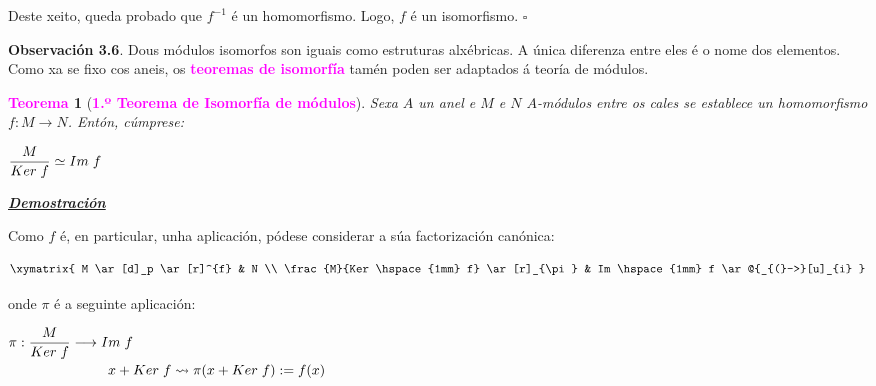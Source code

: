\documentclass[twoside]{report}
\newcommand{\magbf}[1]{\textcolor{magenta}{\textbf{#1}}} %
\theoremstyle{mystyle}
\newtheorem{theo}{\magbf{Teorema}}[chapter]
\newenvironment{theorem}
{\begin{mdframed}[linecolor = magenta,backgroundcolor = classicrose, linewidth = 2mm]\begin{theo}}
{\end{theo}\end{mdframed}}
\begin{document}
\noindent Deste xeito, queda probado que $f^{-1}$ é un homomorfismo. Logo, $f$ é un isomorfismo. $\square$\\

\vspace{3mm}

\noindent \textbf{Observación 3.6}. Dous módulos isomorfos son iguais como estruturas alxébricas. A única diferenza entre eles é o nome dos elementos.\\

\noindent Como xa se fixo cos aneis, os \magbf{teoremas de isomorfía} tamén poden ser adaptados á teoría de módulos.\\

\begin{theorem}[\magbf{1.º Teorema de Isomorfía de módulos}] \label{th3.1}
Sexa $A$ un anel e $M$ e $N$ $A$-módulos entre os cales se establece un homomorfismo $f: M \longrightarrow N$. Entón, cúmprese:
\begin{center}
    $\displaystyle \frac{M}{Ker \hspace{1mm} f} \simeq Im \hspace{1mm} f$
\end{center}
\end{theorem}

\vspace{2mm}

\noindent \textbf{\textit{\underline{Demostración}}}

\vspace{2mm}

\noindent Como $f$ é, en particular, unha aplicación, pódese considerar a súa factorización canónica:

$$
     \large \xymatrix{
        M \ar[d]_p \ar[r]^{f} & N \\
        \frac{M}{Ker \hspace{1mm} f} \ar[r]_{\pi} & Im \hspace{1mm} f \ar@{_{(}->}[u]_{i}
    }  
$$

onde $\pi$ é a seguinte aplicación:

\begin{center}
    $\pi: \displaystyle \frac{M}{Ker \hspace{1mm} f} \longrightarrow Im \hspace{1mm} f$\\
    \vspace{2mm}
    $\hspace{25mm} x + Ker \hspace{1mm} f \leadsto \pi(x + Ker \hspace{1mm} f) := f(x)$ 
\end{center}
\end{document}
